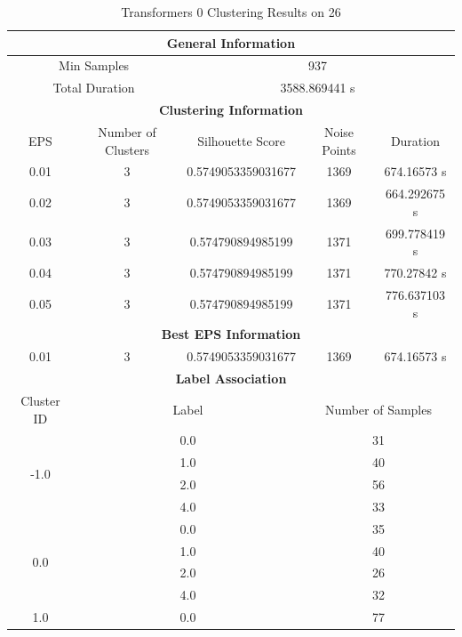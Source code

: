 \begin{longtable}{|c|c|c|c|c|}
\caption{Transformers 0 Clustering Results on 26} \label{tab:26_transformers_0_clustering_results}\\
\hline
\multicolumn{5}{|c|}{\textbf{General Information}} \\
\hline
\multicolumn{2}{|c|}{Min Samples} & \multicolumn{3}{c|}{937} \\
\multicolumn{2}{|c|}{Total Duration} & \multicolumn{3}{c|}{3588.869441 s} \\
\hline
\multicolumn{5}{|c|}{\textbf{Clustering Information}} \\
\hline
EPS & Number of Clusters & Silhouette Score & Noise Points & Duration \\
0.01 & 3 & 0.5749053359031677 & 1369 & 674.16573 s\\
0.02 & 3 & 0.5749053359031677 & 1369 & 664.292675 s\\
0.03 & 3 & 0.574790894985199 & 1371 & 699.778419 s\\
0.04 & 3 & 0.574790894985199 & 1371 & 770.27842 s\\
0.05 & 3 & 0.574790894985199 & 1371 & 776.637103 s\\
\hline
\multicolumn{5}{|c|}{\textbf{Best EPS Information}} \\
\hline
0.01 & 3 & 0.5749053359031677 & 1369 & 674.16573 s\\
\hline
\multicolumn{5}{|c|}{\textbf{Label Association}} \\
\hline
Cluster ID & \multicolumn{2}{c|}{Label} & \multicolumn{2}{c|}{Number of Samples} \\
\hline
\multirow{4}{*}{-1.0} & \multicolumn{2}{c|}{0.0} & \multicolumn{2}{c|}{31} \\
& \multicolumn{2}{c|}{1.0} & \multicolumn{2}{c|}{40} \\
& \multicolumn{2}{c|}{2.0} & \multicolumn{2}{c|}{56} \\
& \multicolumn{2}{c|}{4.0} & \multicolumn{2}{c|}{33} \\
\hline
\multirow{4}{*}{0.0} & \multicolumn{2}{c|}{0.0} & \multicolumn{2}{c|}{35} \\
& \multicolumn{2}{c|}{1.0} & \multicolumn{2}{c|}{40} \\
& \multicolumn{2}{c|}{2.0} & \multicolumn{2}{c|}{26} \\
& \multicolumn{2}{c|}{4.0} & \multicolumn{2}{c|}{32} \\
\hline
\multirow{4}{*}{1.0} & \multicolumn{2}{c|}{0.0} & \multicolumn{2}{c|}{77} \\

\end{longtable}
